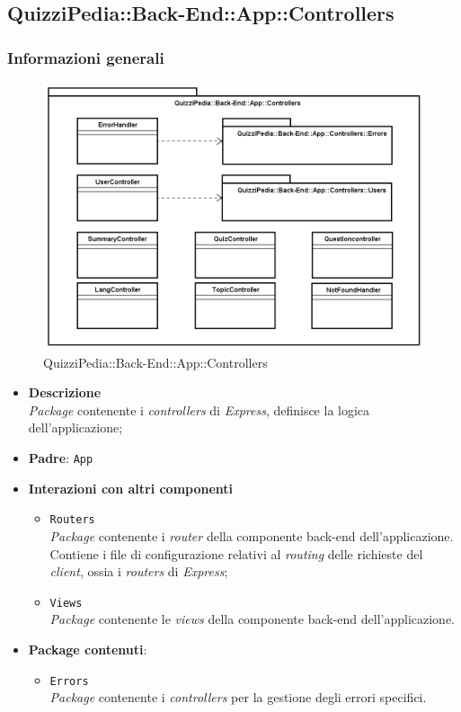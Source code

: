 \subsection{QuizziPedia::Back-End::App::Controllers}
\subsubsection{Informazioni generali}
\label{QuizziPedia::Back-End::App::Controllers}
\begin{figure}[ht]
	\centering
	\includegraphics[scale=0.45]{UML/Package/QuizziPedia_Back-End_App_Controllers.png}
	\caption{QuizziPedia::Back-End::App::Controllers}
\end{figure}
\FloatBarrier
	\begin{itemize}
		\item \textbf{Descrizione} \\
		\textit{Package} contenente i \textit{controllers} di \textit{Express}, definisce la logica dell'applicazione;
		\item \textbf{Padre}: \texttt{App}
		\item \textbf{Interazioni con altri componenti}
			\begin{itemize}
				\item \texttt{Routers} \\
				\textit{Package} contenente i \textit{router} della componente back-end dell'applicazione. Contiene i file di configurazione relativi al \textit{routing} delle richieste del \textit{client}, ossia i \textit{routers} di \textit{Express};
				\item \texttt{Views} \\
				\textit{Package} contenente le \textit{views} della componente back-end dell'applicazione.
			\end{itemize}
		\item \textbf{Package contenuti}:
			\begin{itemize}
				\item \texttt{Errors} \\
				\textit{Package} contenente i \textit{controllers} per la gestione degli errori specifici.
			\end{itemize}
	\end{itemize}
